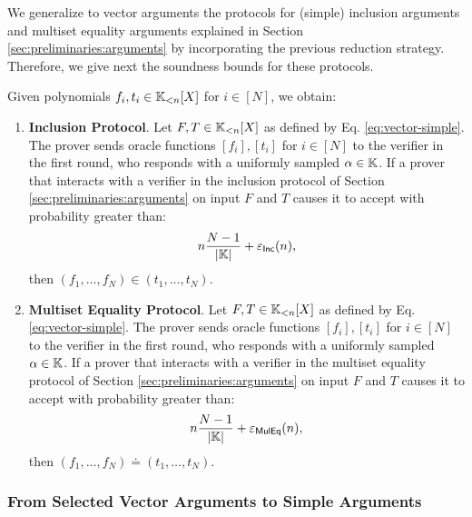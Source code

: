 We generalize to vector arguments the protocols for (simple) inclusion arguments and multiset equality arguments explained in Section \ref{sec:preliminaries:arguments} by incorporating the previous reduction strategy. Therefore, we give next the soundness bounds for these protocols.
\begin{lemma}\label{lemma:vec-to-simple-prot}
  Given polynomials $f_i,t_i \in \mathbb{K}_{<n}[X]$ for $i\in[N]$, we obtain:
  \begin{enumerate}
    \item \textbf{Inclusion Protocol}. Let $F,T \in \mathbb{K}_{<n}[X]$ as defined by Eq. \eqref{eq:vector-simple}. The prover sends oracle functions $[f_{i}],[t_{i}]$ for $i\in[N]$ to the verifier in the first round, who responds with a uniformly sampled $\alpha \in \mathbb{K}$. If a prover that interacts with a verifier in the inclusion protocol of Section \ref{sec:preliminaries:arguments} on input $F$ and $T$ causes it to accept with probability greater than:
    \[
      n\frac{N-1}{|\mathbb{K}|} + \varepsilon_{\textsf{Inc}}(n),
    \]
    then $(f_1,\dots,f_N) \in (t_1,\dots,t_N)$.

    \item \textbf{Multiset Equality Protocol}. Let $F,T \in \mathbb{K}_{<n}[X]$ as defined by Eq. \eqref{eq:vector-simple}. The prover sends oracle functions $[f_{i}],[t_{i}]$ for $i\in[N]$ to the verifier in the first round, who responds with a uniformly sampled $\alpha \in \mathbb{K}$. If a prover that interacts with a verifier in the multiset equality protocol of Section \ref{sec:preliminaries:arguments} on input $F$ and $T$ causes it to accept with probability greater than:
    \[
      n\frac{N-1}{|\mathbb{K}|} + \varepsilon_{\textsf{MulEq}}(n),
    \]
    then $(f_1,\dots,f_N) \doteq (t_1,\dots,t_N)$.
  \end{enumerate} 
\end{lemma}

\subsubsection*{From Selected Vector Arguments to Simple Arguments}

